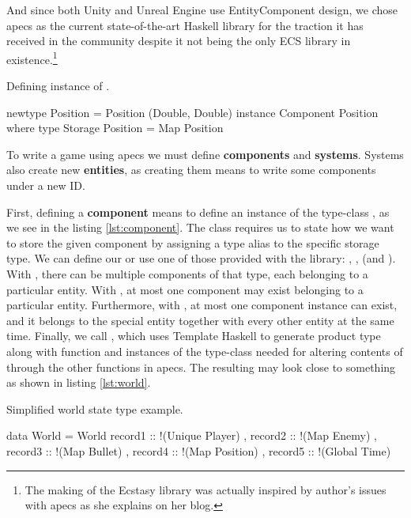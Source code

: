 \documentclass[
  digital, %
  color,   %
  table,   %
  oneside, %
  lof,     %
  lot,     %
]{fithesis3}
\begin{document}
And since both Unity and Unreal Engine use Entity\textendash{}Component design,
we chose apecs as the current state-of-the-art Haskell library
for the traction it has received in the community despite
it not being the only ECS library in existence.\footnote{
The making of the Ecstasy library was actually inspired by
author's issues with apecs as she explains on her blog.\cite{whyecstasy}
}

\begin{listing}[H]
\caption{Defining instance of .}
\begin{haskell}
newtype Position = Position (Double, Double)
instance Component Position where
    type Storage Position = Map Position
\end{haskell}
\label{lst:component}
\end{listing}

To write a game using apecs we must define \textbf{components} and \textbf{systems}.
Systems also create new \textbf{entities},
as creating them means to write some components under a new ID.

First, defining a \textbf{component} means to define an instance of the type-class
, as we see in the listing \ref{lst:component}.
The  class
requires us to state how we want to store the given component
by assigning a type alias to the specific storage type.
We can define our  or use one of those provided
with the library: , ,  (and ).
With , there can be multiple components of that type,
each belonging to a particular entity.
With , at most one component may exist
belonging to a particular entity. Furthermore,
with , at most one component instance can exist,
and it belongs to the special  entity together
with every other entity at the same time. Finally, we call ,
which uses Template Haskell to generate  product type
along with  function and instances of the 
type-class needed for altering contents of  through
the other functions in apecs. The resulting 
may look close to something as shown in listing \ref{lst:world}.

\begin{listing}[H]
\caption{Simplified world state type example.}
\begin{haskell}
data World =
    World
    { record1 :: !(Unique Player)
    , record2 :: !(Map Enemy)
    , record3 :: !(Map Bullet)
    , record4 :: !(Map Position)
    , record5 :: !(Global Time)
    }
\end{haskell}
\label{lst:world}
\end{listing}
\end{document}
